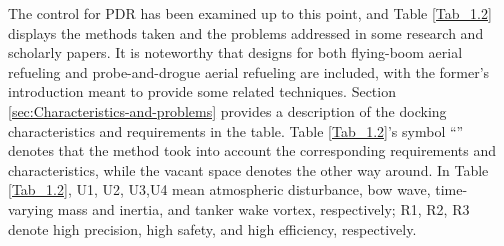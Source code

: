 The control for PDR has been examined up to this point, and Table
\ref{Tab_1.2} displays the methods taken and the problems addressed
in some research and scholarly papers. It is noteworthy that designs
for both flying-boom aerial refueling and probe-and-drogue aerial
refueling are included, with the former's introduction meant to provide
some related techniques. Section \ref{sec:Characteristics-and-problems}
provides a description of the docking characteristics and requirements
in the table. Table \ref{Tab_1.2}'s symbol \textquotedblleft \Checkmark \textquotedblright{}
denotes that the method took into account the corresponding requirements
and characteristics, while the vacant space denotes the other way
around. In Table \ref{Tab_1.2}, U1, U2, U3,U4 mean atmospheric disturbance,
bow wave, time-varying mass and inertia, and tanker wake vortex, respectively;
R1, R2, R3 denote high precision, high safety, and high efficiency,
respectively.

